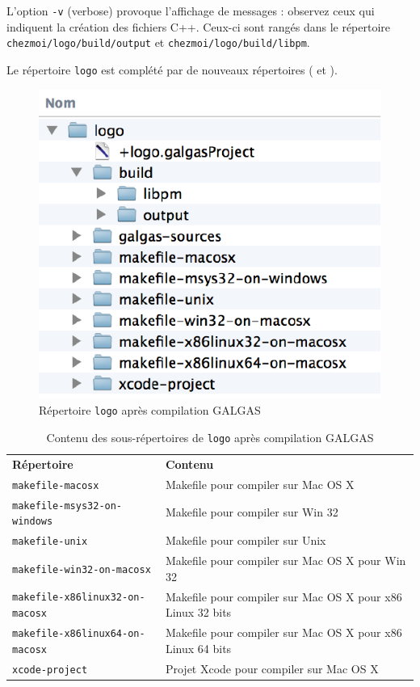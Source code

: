 L'option \texttt{-v} (verbose) provoque l'affichage de messages : observez ceux qui indiquent la création des fichiers C++. Ceux-ci sont rangés dans le répertoire \texttt{chezmoi/logo/build/output} et \texttt{chezmoi/logo/build/libpm}.

Le répertoire \texttt{logo} est complété par de nouveaux répertoires ( et ).
\begin{figure}[t]
  \centering
  \includegraphics{partie-utilisation/repertoire-logo.pdf}
  \caption{Répertoire \texttt{logo} après compilation GALGAS}
  \ligne
\end{figure}


\begin{table}[t]
  \centering
  \begin{tabular}{ll}
    \textbf{Répertoire} & \textbf{Contenu} \\
    \texttt{makefile-macosx} & Makefile pour compiler sur Mac OS X \\
    \texttt{makefile-msys32-on-windows} & Makefile pour compiler sur Win 32 \\
    \texttt{makefile-unix} & Makefile pour compiler sur Unix \\
    \texttt{makefile-win32-on-macosx} & Makefile pour compiler sur Mac OS X pour Win 32 \\
    \texttt{makefile-x86linux32-on-macosx} & Makefile pour compiler sur Mac OS X pour x86 Linux 32 bits \\
    \texttt{makefile-x86linux64-on-macosx} & Makefile pour compiler sur Mac OS X pour x86 Linux 64 bits \\
    \texttt{xcode-project} & Projet Xcode pour compiler sur Mac OS X
  \end{tabular}
  \caption{Contenu des sous-répertoires de \texttt{logo} après compilation GALGAS}
  \ligne
\end{table}



